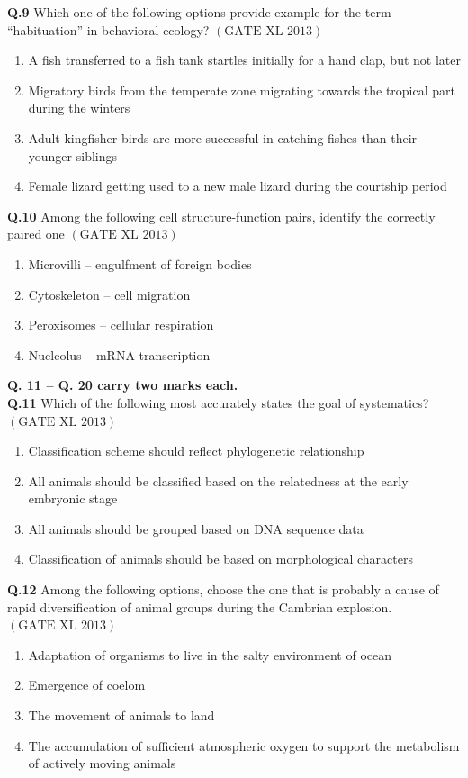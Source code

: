 \documentclass[12pt]{article}
\theoremstyle{remark}
\providecommand{\brak}[1]{\ensuremath{\left(#1\right)}}
\begin{document}
\textbf{Q.9} Which one of the following options provide example for the term “habituation” in behavioral ecology? \hfill $\brak{\text{GATE XL 2013}}$
\begin{enumerate}
    \item A fish transferred to a fish tank startles initially for a hand clap, but not later
    \item Migratory birds from the temperate zone migrating towards the tropical part during the winters
    \item Adult kingfisher birds are more successful in catching fishes than their younger siblings
    \item Female lizard getting used to a new male lizard during the courtship period
\end{enumerate}

\textbf{Q.10} Among the following cell structure-function pairs, identify the correctly paired one \hfill $\brak{\text{GATE XL 2013}}$
\begin{enumerate}
    \item Microvilli – engulfment of foreign bodies
    \item Cytoskeleton – cell migration
    \item Peroxisomes – cellular respiration
    \item Nucleolus – mRNA transcription
\end{enumerate}

\noindent\textbf{Q. 11 – Q. 20 carry two marks each.}\\

\textbf{Q.11} Which of the following most accurately states the goal of systematics? \hfill $\brak{\text{GATE XL 2013}}$
\begin{enumerate}
    \item Classification scheme should reflect phylogenetic relationship
    \item All animals should be classified based on the relatedness at the early embryonic stage
    \item All animals should be grouped based on DNA sequence data
    \item Classification of animals should be based on morphological characters
\end{enumerate}

\textbf{Q.12} Among the following options, choose the one that is probably a cause of rapid diversification of animal groups during the Cambrian explosion. \hfill $\brak{\text{GATE XL 2013}}$
\begin{enumerate}
    \item Adaptation of organisms to live in the salty environment of ocean
    \item Emergence of coelom
    \item The movement of animals to land
    \item The accumulation of sufficient atmospheric oxygen to support the metabolism of actively moving animals
\end{enumerate}
\end{document}
